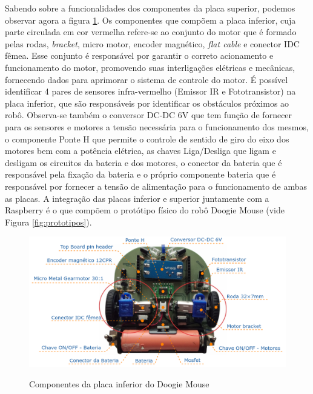 Sabendo sobre a funcionalidades dos componentes da placa superior, podemos observar agora a figura \ref{fig:bottom_board_elementos}. Os componentes que compõem a placa inferior, cuja parte circulada em cor vermelha refere-se ao conjunto do motor que é formado pelas rodas, \textit{bracket}, micro motor, encoder magnético, \textit{flat cable} e conector IDC fêmea. Esse conjunto é responsável por garantir o correto acionamento e funcionamento do motor, promovendo suas interligações elétricas e mecânicas, fornecendo dados para aprimorar o sistema de controle do motor. É possível identificar 4 pares de sensores infra-vermelho (Emissor IR e Fototransistor) na placa inferior, que são responsáveis por identificar os obstáculos próximos ao robô. Observa-se também o conversor DC-DC 6V que tem função de fornecer para os sensores e motores a tensão necessária para o funcionamento dos mesmos, o componente Ponte H que permite o controle de sentido de giro do eixo dos motores bem com a potência elétrica, as chaves Liga/Desliga que ligam e desligam os circuitos da bateria e dos motores, o conector da bateria que é responsável pela fixação da bateria e o próprio componente bateria que é responsável por fornecer a tensão de alimentação para o funcionamento de ambas as placas. A integração das placas inferior e superior juntamente com a Raspberry é o que compõem o protótipo físico do robô Doogie Mouse (vide Figura \ref{fig:prototipos}).

\begin{figure}[H]
	\centering
	\caption{Componentes da placa inferior do Doogie Mouse}
	\includegraphics[width=1\textwidth]
	{Figures/bottom_board_elementos.png}
	\label{fig:bottom_board_elementos}
\end{figure}

